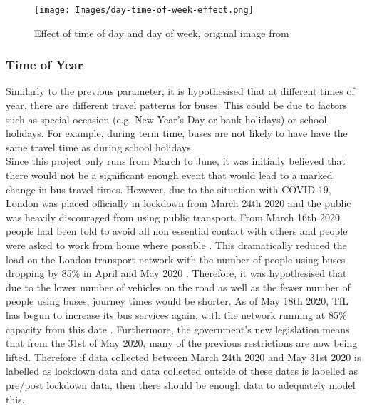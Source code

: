 \begin{figure}[H]
\begin{center}
    \texttt{[image: Images/day-time-of-week-effect.png]}
    \caption{Effect of time of day and day of week, original image from \cite{dynamic-gps}}
    \label{fig:time-of-day-week}
\end{center}
\end{figure}

\subsubsection{Time of Year}

Similarly to the previous parameter, it is hypothesised that at different times of year, there are different travel patterns for buses. This could be due to factors such as special occasion (e.g. New Year's Day or bank holidays) or school holidays. For example, during term time, buses are not likely to have have the same travel time as during school holidays. \\

Since this project only runs from March to June, it was initially believed that there would not be a significant enough event that would lead to a marked change in bus travel times. However, due to the situation with COVID-19, London was placed officially in lockdown from March 24th 2020 and the public was heavily discouraged from using public transport. From March 16th 2020 people had been told to avoid all non essential contact with others and people were asked to work from home where possible \cite{london-lockdown-dates}. This dramatically reduced the load on the London transport network with the number of people using buses dropping by 85\% in April and May 2020 \cite{tfl-press-release-april}. Therefore, it was hypothesised that due to the lower number of vehicles on the road as well as the fewer number of people using buses, journey times would be shorter. As of May 18th 2020, TfL has begun to increase its bus services again, with the network running at 85\% capacity from this date \cite{tfl-press-release-may}. Furthermore, the government's new legislation means that from the 31st of May 2020, many of the previous restrictions are now being lifted. Therefore if data collected between March 24th 2020 and May 31st 2020 is labelled as lockdown data and data collected outside of these dates is labelled as pre/post lockdown data, then there should be enough data to adequately model this. \\

